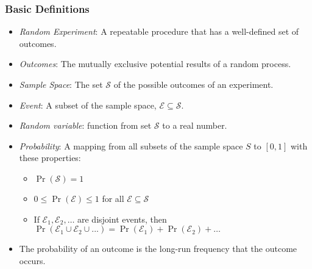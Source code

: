 

\begin{frame}
\frametitle{Basic Definitions}
\begin{itemize}
\item \emph{Random Experiment}: 
A repeatable procedure that has a well-defined set of outcomes.
\item \emph{Outcomes}: The mutually exclusive potential results of a random process.
\item \emph{Sample Space}: The set $\mathcal{S}$ of the possible outcomes of an experiment.
\item \emph{Event}: A subset of the sample space, $\mathcal{E} \subseteq \mathcal{S}$.
\item \emph{Random variable}: function from set $\mathcal{S}$ to a real number.
\item \emph{Probability}: A mapping from all subsets of the sample space $S$ to $[0,1]$ with these properties:%
\begin{itemize}
\item \label{P1} $\Pr(\mathcal{S}) = 1$
\item \label{P2} $0 \leq \Pr(\mathcal{E}) \leq 1$ for all $\mathcal{E} \subseteq \mathcal{S}$
\item \label{P3} If $\mathcal{E}_1, \mathcal{E}_2,\ldots$ are disjoint events, then 
$\Pr(\mathcal{E}_1 \cup \mathcal{E}_2 \cup ...) = \Pr (\mathcal{E}_1) + \Pr (\mathcal{E}_2) + \ldots$
\end{itemize}
\item The probability of an outcome is the long-run frequency that the outcome occurs. 
\end{itemize}
\end{frame}


